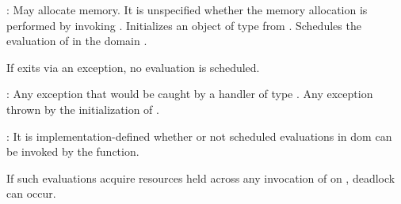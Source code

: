 \pnum
{}: May allocate memory.
It is unspecified whether the memory allocation is performed by
invoking  .
Initializes an object  of type  from
.
Schedules the evaluation of  in the domain
.
\begin{note}
If  exits via an exception, no evaluation
is scheduled.
\end{note}

\pnum
{}: Any exception that would be caught by a handler of type
.
Any exception thrown by the initialization of .

\pnum
{}: It is implementation-defined whether or not scheduled
evaluations in dom can be invoked by the 
function.
\begin{note}
If such evaluations acquire resources held across any invocation
of  on , deadlock can occur.
\end{note}
